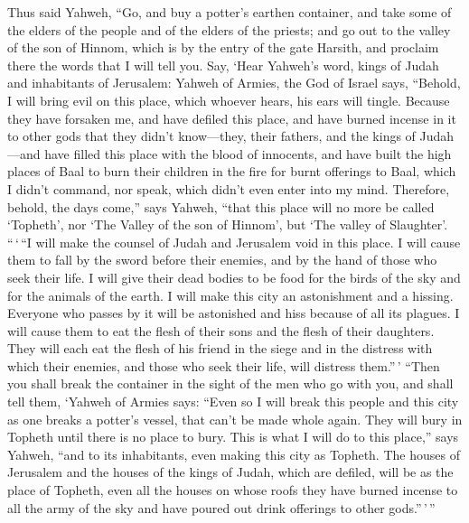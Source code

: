  Thus said Yahweh, ``Go, and buy a potter's earthen
container, and take some of the elders of the people and of the elders
of the priests;  and go out to the valley of the son of
Hinnom, which is by the entry of the gate Harsith, and proclaim there
the words that I will tell you.  Say, `Hear Yahweh's word,
kings of Judah and inhabitants of Jerusalem: Yahweh of Armies, the God
of Israel says, ``Behold, I will bring evil on this place, which whoever
hears, his ears will tingle.  Because they have forsaken
me, and have defiled this place, and have burned incense in it to other
gods that they didn't know---they, their fathers, and the kings of
Judah---and have filled this place with the blood of innocents,
 and have built the high places of Baal to burn their
children in the fire for burnt offerings to Baal, which I didn't
command, nor speak, which didn't even enter into my mind. 
Therefore, behold, the days come,'' says Yahweh, ``that this place will
no more be called `Topheth', nor `The Valley of the son of Hinnom', but
`The valley of Slaughter'.  ``\,`\,``I will make the
counsel of Judah and Jerusalem void in this place. I will cause them to
fall by the sword before their enemies, and by the hand of those who
seek their life. I will give their dead bodies to be food for the birds
of the sky and for the animals of the earth.  I will make
this city an astonishment and a hissing. Everyone who passes by it will
be astonished and hiss because of all its plagues.  I will
cause them to eat the flesh of their sons and the flesh of their
daughters. They will each eat the flesh of his friend in the siege and
in the distress with which their enemies, and those who seek their life,
will distress them.''\,'  ``Then you shall break the
container in the sight of the men who go with you,  and
shall tell them, `Yahweh of Armies says: ``Even so I will break this
people and this city as one breaks a potter's vessel, that can't be made
whole again. They will bury in Topheth until there is no place to bury.
 This is what I will do to this place,'' says Yahweh,
``and to its inhabitants, even making this city as Topheth.
 The houses of Jerusalem and the houses of the kings of
Judah, which are defiled, will be as the place of Topheth, even all the
houses on whose roofs they have burned incense to all the army of the
sky and have poured out drink offerings to other gods.''\,'\,''

